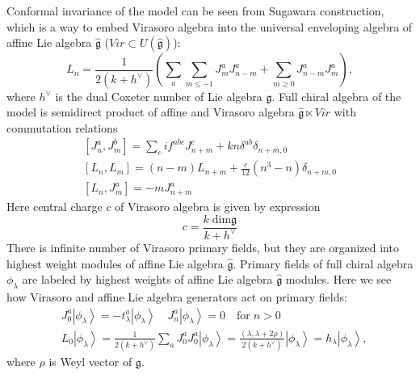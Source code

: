 \documentclass[a4paper]{jpconf}
\theoremstyle{definition}
\newcommand{\gf}{\mathfrak{g}}
\newcommand{\gfh}{\hat{\mathfrak{g}}}
\theoremstyle{definition} \newtheorem{Def}{Definition}
\begin{document}
Conformal invariance of the model can  be seen from 
Sugawara construction, which is a way to embed Virasoro algebra into the universal enveloping algebra of affine Lie algebra $\gfh$ ($Vir\subset U(\gfh)$):
\begin{equation}
  \label{eq:4}
  L_n=\frac{1}{2(k+h^{\vee})}\left(\sum\limits_a\sum\limits_{m\leq -1}J^a_m J^a_{n-m}+\sum_{m\geq 0} J^{a}_{n-m}J^{a}_{m}\right), 
\end{equation}
 where $h^{\vee}$ is the dual Coxeter number of Lie algebra $\gf$. 
Full chiral algebra of the model is semidirect product of affine and Virasoro algebra $\gfh \ltimes Vir$ with commutation relations 
  \begin{equation}
    \label{eq:92}
    \begin{aligned}
      \left[J^a_n,J^b_m\right]=\sum_c i f^{abc}J^c_{n+m}+kn\delta^{ab}\delta_{n+m,0} \\
      \left[L_n,L_m\right]=(n-m)L_{n+m}+\frac{c}{12}(n^3-n)\delta_{n+m,0}\\
      \left[L_n,J^a_m\right]=-mJ^a_{n+m}
    \end{aligned}
  \end{equation}
Here central charge $c$ of Virasoro algebra is given by expression
\begin{equation}
  \label{eq:25}
  c=\frac{k\;\mathrm{dim}\gf}{k+h^{\vee}}
\end{equation}
There is infinite number of Virasoro primary fields, but they are organized into highest weight modules of affine Lie algebra $\gfh$. 
Primary fields of full chiral algebra $\phi_{\lambda}$ are labeled by highest weights of affine Lie algebra $\gfh$ modules. Here we see how Virasoro and affine Lie algebra generators act on primary fields:
  \begin{equation*}
    \begin{aligned}
      & J_0^a\left|\phi_{\lambda}\right>=-t^a_{\lambda}\left|\phi_{\lambda}\right>  \quad    J^a_n\left|\phi_{\lambda}\right>=0 \quad \mbox{for}\; n>0 \\
      & L_0\left|\phi_{\lambda}\right>=\frac{1}{2(k+h^{\vee})}\sum_aJ^a_0J^a_0\left|\phi_{\lambda}\right>=\frac{(\lambda,\lambda+2\rho)}{2(k+h^{\vee})}\left|\phi_{\lambda}\right>=h_{\lambda} \left|\phi_{\lambda}\right>,
    \end{aligned}
  \end{equation*}
where $\rho$ is Weyl vector of $\gf$. 
\end{document}
